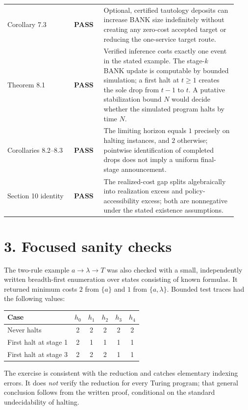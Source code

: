 \documentclass[11pt,letterpaper]{article}
\newcommand{\PASS}{\textbf{PASS}}
\begin{document}
\begin{longtable}{@{}p{0.27\linewidth}p{0.12\linewidth}p{0.54\linewidth}@{}}
Corollary 7.3 & \PASS & Optional, certified tautology deposits can increase BANK size indefinitely without creating any zero-cost accepted target or reducing the one-service target route.\\
Theorem 8.1 & \PASS & Verified inference costs exactly one event in the stated example. The stage-$k$ BANK update is computable by bounded simulation; a first halt at $t\ge1$ creates the sole drop from $t-1$ to $t$. A putative stabilization bound $N$ would decide whether the simulated program halts by time $N$.\\
Corollaries 8.2--8.3 & \PASS & The limiting horizon equals $1$ precisely on halting instances, and $2$ otherwise; pointwise identification of completed drops does not imply a uniform final-stage announcement.\\
Section 10 identity & \PASS & The realized-cost gap splits algebraically into realization excess and policy-accessibility excess; both are nonnegative under the stated existence assumptions.\\
\bottomrule
\end{longtable}

\section*{3. Focused sanity checks}
The two-rule example $a\to\lambda\to T$ was also checked with a small, independently written breadth-first enumeration over states consisting of known formulas. It returned minimum costs $2$ from $\{a\}$ and $1$ from $\{a,\lambda\}$. Bounded test traces had the following values:
\begin{center}
\begin{tabular}{@{}lccccc@{}}
\toprule
Case & $h_0$ & $h_1$ & $h_2$ & $h_3$ & $h_4$\\\midrule
Never halts & 2 & 2 & 2 & 2 & 2\\
First halt at stage 1 & 2 & 1 & 1 & 1 & 1\\
First halt at stage 3 & 2 & 2 & 2 & 1 & 1\\
\bottomrule
\end{tabular}
\end{center}
The exercise is consistent with the reduction and catches elementary indexing errors. It does \emph{not} verify the reduction for every Turing program; that general conclusion follows from the written proof, conditional on the standard undecidability of halting.
\end{document}
